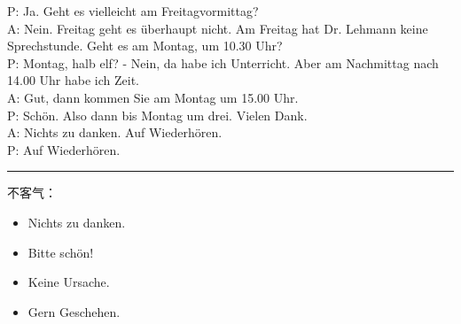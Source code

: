 P: Ja. Geht es vielleicht am Freitagvormittag? \\
A: Nein. Freitag geht es überhaupt nicht.  Am Freitag hat Dr. Lehmann keine Sprechstunde.  Geht es am Montag, um 10.30 Uhr? \\
P: Montag, halb elf? - Nein, da habe ich Unterricht. Aber am Nachmittag nach 14.00 Uhr habe ich Zeit. \\
A: Gut, dann kommen Sie am Montag um 15.00 Uhr. \\
P: Schön. Also dann bis Montag um drei.  Vielen Dank. \\
A: Nichts zu danken. Auf Wiederhören.  \\
P: Auf Wiederhören. \\

\rule{\textwidth}{0.05em}
不客气：
\begin{itemize}
    \item Nichts zu danken.
    \item Bitte schön!
    \item Keine Ursache. 
          \\
    \item Gern Geschehen. 
          \\
\end{itemize}

